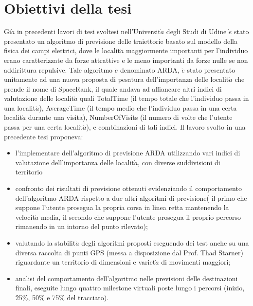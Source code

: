\section{Obiettivi della tesi}
Gi$\grave{a}$ in precedenti lavori di tesi svoltesi nell'Universit$\grave{a}$ degli Studi di Udine $\grave{e}$
stato presentato un algoritmo di previsione delle traiettorie basato sul modello
della fisica dei campi elettrici, dove le localit$\grave{a}$ maggiormente importanti
per l'individuo erano caratterizzate da forze attrattive e le meno importanti
da forze nulle se non addirittura repulsive. Tale algoritmo $\grave{e}$ denominato
ARDA, $\grave{e}$ stato presentato unitamente ad una nuova proposta di pesatura dell'importanza
delle localit$\grave{a}$ che prende il nome di SpaceRank, il quale andava
ad affiancare altri indici di valutazione delle localit$\grave{a}$ quali TotalTime (il tempo
totale che l'individuo passa in una localit$\grave{a}$), AverageTime (il tempo medio che
l'individuo passa in una certa localit$\grave{a}$ durante una visita), NumberOfVisits (il
numero di volte che l'utente passa per una certa localit$\grave{a}$), e combinazioni di
tali indici.
Il lavoro svolto in una precedente tesi \cite{new_1} proponeva:
\begin{itemize}
\item l'implementare dell'algoritmo di previsione ARDA utilizzando vari indici di valutazione
dell'importanza delle localit$\grave{a}$, con diverse suddivisioni di territorio

\item confronto dei risultati di previsione ottenuti evidenziando il comportamento
dell'algoritmo ARDA rispetto a due altri algoritmi di previsione( il primo
che suppone l'utente prosegua la propria corsa in linea retta mantenendo la
velocit$\grave{a}$ media, il secondo che suppone l'utente prosegua il proprio percorso
rimanendo in un intorno del punto rilevato);

\item valutando la stabilit$\grave{a}$ degli algoritmi proposti eseguendo dei test anche su una diversa raccolta di punti GPS (messa a disposizione
dal Prof. Thad Starner) riguardante un territorio di dimensioni e variet$\grave{a}$ di movimenti maggiori;

\item analisi del comportamento dell'algoritmo nelle previsioni delle destinazioni finali, eseguite
lungo quattro milestone virtuali poste lungo i percorsi (inizio, 25\%, 50\% e 75\% del tracciato).

\end{itemize}

